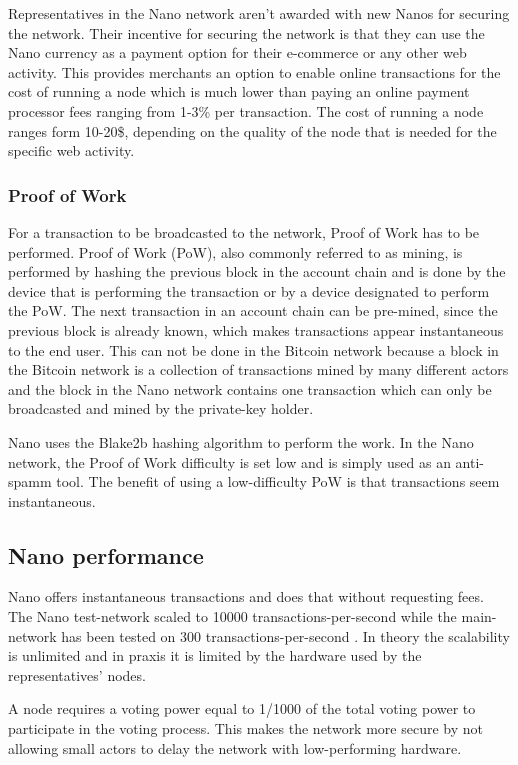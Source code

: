 \documentclass{ferseminar}
\begin{document}
Representatives in the Nano network aren't awarded with new Nanos for securing the network. Their incentive for securing the network is that they can use the Nano currency as a payment option for their e-commerce or any other web activity. This provides merchants an option to enable online transactions for the cost of running a node which is much lower than paying an online payment processor fees ranging from 1-3\% per transaction. The cost of running a node ranges form 10-20\$, depending on the quality of the node that is needed for the specific web activity.
\subsubsection{Proof of Work}

For a transaction to be broadcasted to the network, Proof of Work has to be performed. Proof of Work (PoW), also commonly referred to as mining, is performed by hashing the previous block in the account chain and is done by the device that is performing the transaction or by a device designated to perform the PoW. The next transaction in an account chain can be pre-mined, since the previous block is already known, which makes transactions appear instantaneous to the end user. This can not be done in the Bitcoin network because a block in the Bitcoin network is a collection of transactions mined by many different actors and the block in the Nano network contains one transaction which can only be broadcasted and mined by the private-key holder.

Nano uses the Blake2b hashing algorithm to perform the work. In the Nano network, the Proof of Work difficulty is set low and is simply used as an anti-spamm tool. The benefit of using a low-difficulty PoW is that transactions seem instantaneous.


\subsection{Nano performance}
Nano offers instantaneous transactions and does that without requesting fees. The Nano test-network scaled to 10000 transactions-per-second while the main-network has been tested on 300 transactions-per-second \cite{Stress}. In theory the scalability is unlimited and in praxis it is limited by the hardware used by the representatives' nodes.

A node requires a voting power equal to 1/1000 of the total voting power to participate in the voting process. This makes the network more secure by not allowing small actors to delay the network with low-performing hardware.
\end{document}
